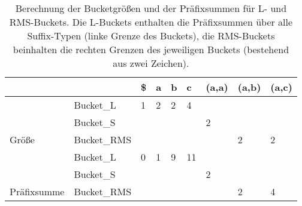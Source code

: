 \begin{table}
	\centering
	\begin{tabular}{|l|l|l|l|l|l|l|l|l|}
		\hline
		&             & \$                        & a                         & b                         & c                          & (a,a) & (a,b)                     & (a,c)                     \\ \hline
		& Bucket\_L   & 1                         & 2                         & 2                         & 4                          &       &                           &                           \\ \cline{2-9} 
		& Bucket\_S   &                           &                           &                           &                            & 2     &                           &                           \\ \cline{2-9} 
		\multirow{-3}{*}{Größe}       & Bucket\_RMS &                           &                           &                           &                            &       & 2                         & 2                         \\ \hline
		& Bucket\_L   & \cellcolor[HTML]{3531FF}0 & \cellcolor[HTML]{3531FF}1 & \cellcolor[HTML]{3531FF}9 & \cellcolor[HTML]{3531FF}11 &       &                           &                           \\ \cline{2-9} 
		& Bucket\_S   &                           &                           &                           &                            & 2     &                           &                           \\ \cline{2-9} 
		\multirow{-3}{*}{Präfixsumme} & Bucket\_RMS &                           &                           &                           &                            &       & \cellcolor[HTML]{32CB00}2 & \cellcolor[HTML]{32CB00}4 \\ \hline
	\end{tabular}
	\caption{Berechnung der Bucketgrößen und der Präfixsummen für L- und RMS-Buckets. Die L-Buckets enthalten die Präfixsummen über alle Suffix-Typen (linke Grenze des Buckets), die RMS-Buckets beinhalten die rechten Grenzen des jeweiligen Buckets (bestehend aus zwei Zeichen).}
	\label{table:prefixsum}
\end{table}


